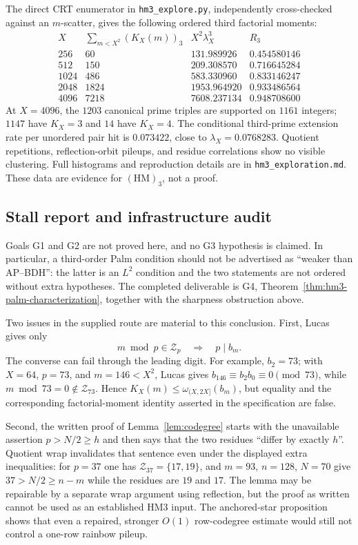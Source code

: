 The direct CRT enumerator in \texttt{hm3\_explore.py}, independently
cross-checked against an $m$-scatter, gives the following ordered third
factorial moments:
\[
\begin{array}{c|r|r|c}
X&\sum_{m<X^2}(K_X(m))_3&X^2\lambda_X^3&R_3\\ \hline
256&60&131.989926&0.454580146\\
512&150&209.308570&0.716645284\\
1024&486&583.330960&0.833146247\\
2048&1824&1953.964920&0.933486564\\
4096&7218&7608.237134&0.948708600
\end{array}
\]
At $X=4096$, the $1203$ canonical prime triples are supported on $1161$
integers; $1147$ have $K_X=3$ and $14$ have $K_X=4$.  The conditional
third-prime extension rate per unordered pair hit is $0.073422$, close to
$\lambda_X=0.0768283$.  Quotient repetitions, reflection-orbit pileups,
and residue correlations show no visible clustering.  Full histograms and
reproduction details are in \texttt{hm3\_exploration.md}.  These data are
evidence for $(\mathrm{HM})_3$, not a proof.

\subsection*{Stall report and infrastructure audit}

Goals G1 and G2 are not proved here, and no G3 hypothesis is claimed.
In particular, a third-order Palm condition should not be advertised as
``weaker than AP--BDH'': the latter is an $L^2$ condition and the two
statements are not ordered without extra hypotheses.  The completed
deliverable is G4, Theorem~\ref{thm:hm3-palm-characterization}, together
with the sharpness obstruction above.

Two issues in the supplied route are material to this conclusion.
First, Lucas gives only
\[
  m\bmod p\in\mathcal Z_p\quad\Longrightarrow\quad p\mid b_m.
\]
The converse can fail through the leading digit.  For example, $b_2=73$;
with $X=64$, $p=73$, and $m=146<X^2$, Lucas gives
$b_{146}\equiv b_2b_0\equiv0\pmod{73}$, while
$m\bmod73=0\notin\mathcal Z_{73}$.  Hence
$K_X(m)\le\omega_{(X,2X]}(b_m)$, but equality and the corresponding
factorial-moment identity asserted in the specification are false.

Second, the written proof of Lemma~\ref{lem:codegree} starts with the
unavailable assertion $p>N/2\ge h$ and then says that the two residues
``differ by exactly $h$''.  Quotient wrap invalidates that sentence even
under the displayed extra inequalities: for $p=37$ one has
$\mathcal Z_{37}=\{17,19\}$, and $m=93$, $n=128$, $N=70$ give
$37>N/2\ge n-m$ while the residues are $19$ and $17$.  The lemma may be
repairable by a separate wrap argument using reflection, but the proof as
written cannot be used as an established HM3 input.  The anchored-star
proposition shows that even a repaired, stronger $O(1)$ row-codegree
estimate would still not control a one-row rainbow pileup.

